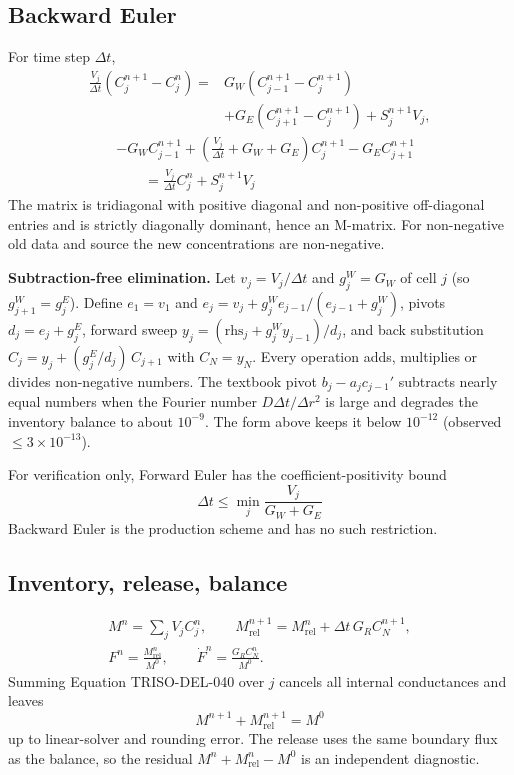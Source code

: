\documentclass[11pt]{article}
\begin{document}
\subsection{Backward Euler}
For time step $\Delta t$,
\[
\begin{aligned}
\frac{V_j}{\Delta t}\left(C_j^{n+1}-C_j^n\right)={}&G_W\left(C_{j-1}^{n+1}-C_j^{n+1}\right)\\
&+G_E\left(C_{j+1}^{n+1}-C_j^{n+1}\right)+S_j^{n+1}V_j,
\end{aligned}
\]
\begin{equation}
\boxed{
\begin{aligned}
&-G_WC_{j-1}^{n+1}+\left(\frac{V_j}{\Delta t}+G_W+G_E\right)C_j^{n+1}-G_EC_{j+1}^{n+1}\\
&\qquad=\frac{V_j}{\Delta t}C_j^n+S_j^{n+1}V_j
\end{aligned}}
\tag{TRISO-DEL-040}
\end{equation}
The matrix is tridiagonal with positive diagonal and non-positive off-diagonal entries and is strictly diagonally dominant, hence an M-matrix. For non-negative old data and source the new concentrations are non-negative.

\textbf{Subtraction-free elimination.} Let $v_j=V_j/\Delta t$ and $g_j^W=G_W$ of cell $j$ (so $g^W_{j+1}=g^E_j$). Define $e_1=v_1$ and $e_j=v_j+g^W_je_{j-1}/(e_{j-1}+g^W_j)$, pivots $d_j=e_j+g^E_j$, forward sweep $y_j=(\mathrm{rhs}_j+g^W_jy_{j-1})/d_j$, and back substitution $C_j=y_j+(g^E_j/d_j)\,C_{j+1}$ with $C_N=y_N$. Every operation adds, multiplies or divides non-negative numbers. The textbook pivot $b_j-a_jc_{j-1}'$ subtracts nearly equal numbers when the Fourier number $D\Delta t/\Delta r^2$ is large and degrades the inventory balance to about $10^{-9}$. The form above keeps it below $10^{-12}$ (observed $\le3\times10^{-13}$).

For verification only, Forward Euler has the coefficient-positivity bound
\begin{equation}
\boxed{\Delta t\le\min_j\frac{V_j}{G_W+G_E}}
\tag{TRISO-FV-300}
\end{equation}
Backward Euler is the production scheme and has no such restriction.

\subsection{Inventory, release, balance}
\[
\begin{gathered}
M^n=\sum_jV_jC_j^n,\qquad M_{\mathrm{rel}}^{n+1}=M_{\mathrm{rel}}^n+\Delta t\,G_RC_N^{n+1},\\
F^n=\frac{M_{\mathrm{rel}}^n}{M^0},\qquad \dot F^n=\frac{G_RC_N^n}{M^0}.
\end{gathered}
\]
Summing Equation TRISO-DEL-040 over $j$ cancels all internal conductances and leaves
\[
M^{n+1}+M_{\mathrm{rel}}^{n+1}=M^0
\]
up to linear-solver and rounding error. The release uses the same boundary flux as the balance, so the residual $M^n+M_{\mathrm{rel}}^n-M^0$ is an independent diagnostic.
\end{document}
